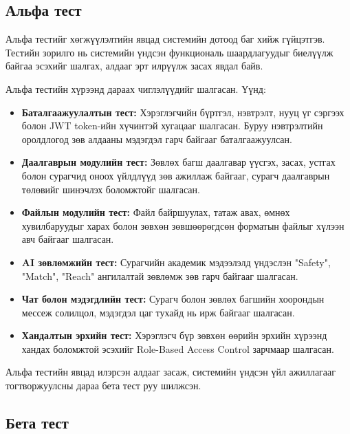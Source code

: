 \subsection*{Альфа тест}

Альфа тестийг хөгжүүлэлтийн явцад системийн дотоод баг хийж гүйцэтгэв.
Тестийн зорилго нь системийн үндсэн функциональ шаардлагуудыг биелүүлж
байгаа эсэхийг шалгах, алдааг эрт илрүүлж засах явдал байв.

Альфа тестийн хүрээнд дараах чиглэлүүдийг шалгасан. Үүнд:

\begin{itemize}
    \item \textbf{Баталгаажуулалтын тест:} Хэрэглэгчийн бүртгэл,
    нэвтрэлт, нууц үг сэргээх болон JWT token-ийн хүчинтэй хугацааг
    шалгасан. Буруу нэвтрэлтийн оролдлогод зөв алдааны мэдэгдэл
    гарч байгааг баталгаажуулсан.

    \item \textbf{Даалгаврын модулийн тест:} Зөвлөх багш даалгавар
    үүсгэх, засах, устгах болон сурагчид оноох үйлдлүүд зөв ажиллаж
    байгааг, сурагч даалгаврын төлөвийг шинэчлэх боломжтойг шалгасан.

    \item \textbf{Файлын модулийн тест:} Файл байршуулах, татаж авах,
    өмнөх хувилбаруудыг харах болон зөвхөн зөвшөөрөгдсөн форматын
    файлыг хүлээн авч байгааг шалгасан.

    \item \textbf{AI зөвлөмжийн тест:} Сурагчийн академик мэдээлэлд
    үндэслэн "Safety", "Match", "Reach" ангилалтай зөвлөмж зөв
    гарч байгааг шалгасан.

    \item \textbf{Чат болон мэдэгдлийн тест:} Сурагч болон зөвлөх
    багшийн хоорондын мессеж солилцол, мэдэгдэл цаг тухайд нь
    ирж байгааг шалгасан.

    \item \textbf{Хандалтын эрхийн тест:} Хэрэглэгч бүр зөвхөн өөрийн
    эрхийн хүрээнд хандах боломжтой эсэхийг Role-Based Access Control
    зарчмаар шалгасан.
\end{itemize}

Альфа тестийн явцад илэрсэн алдааг засаж, системийн үндсэн
үйл ажиллагааг тогтворжуулсны дараа бета тест руу шилжсэн.

\subsection*{Бета тест}


